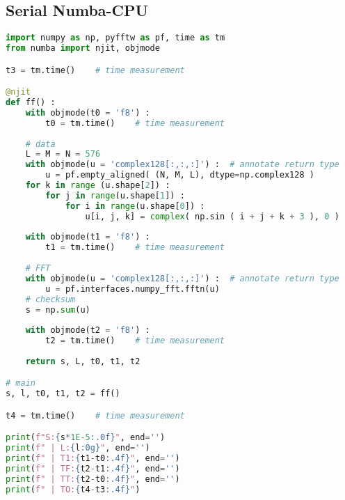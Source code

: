 \subsection{Serial Numba-CPU}
\begin{lstlisting}[language=Python, caption={Serial Numba-CPU implementation of the FFT test case.}]
import numpy as np, pyfftw as pf, time as tm
from numba import njit, objmode

t3 = tm.time()    # time measurement

@njit
def ff() :
    with objmode(t0 = 'f8') :
        t0 = tm.time()    # time measurement
    
    # data
    L = M = N = 576
    with objmode(u = 'complex128[:,:,:]') :  # annotate return type
        u = pf.empty_aligned( (N, M, L), dtype=np.complex128 )
    for k in range (u.shape[2]) :
        for j in range(u.shape[1]) :
            for i in range(u.shape[0]) :
                u[i, j, k] = complex( np.sin ( i + j + k + 3 ), 0 )
    
    with objmode(t1 = 'f8') :
        t1 = tm.time()    # time measurement
    
    # FFT
    with objmode(u = 'complex128[:,:,:]') :  # annotate return type
        u = pf.interfaces.numpy_fft.fftn(u)
    # checksum
    s = np.sum(u)
    
    with objmode(t2 = 'f8') :
        t2 = tm.time()    # time measurement
    
    return s, L, t0, t1, t2

# main
s, l, t0, t1, t2 = ff()

t4 = tm.time()    # time measurement

print(f"S:{s*1E-5:.0f}", end='')
print(f" | L:{l:0g}", end='')
print(f" | T1:{t1-t0:.4f}", end='')
print(f" | TF:{t2-t1:.4f}", end='')
print(f" | TT:{t2-t0:.4f}", end='')
print(f" | TO:{t4-t3:.4f}")
\end{lstlisting}




